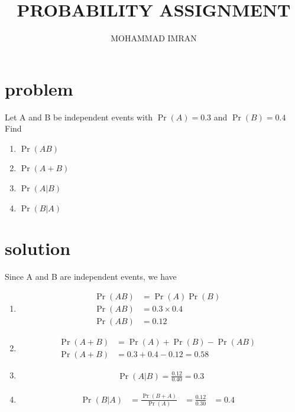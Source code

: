 \documentclass[journal,12pt,twocolumn]{article}
\title{PROBABILITY ASSIGNMENT}
\author{MOHAMMAD IMRAN}
\providecommand{\pr}[1]{\ensuremath{\Pr\left(#1\right)}}
\begin{document}
\maketitle
\bigskip

\section{problem }

Let A and B be independent events with $\pr{A}=0.3$ and $\pr{B}=0.4$ Find 
\begin{enumerate}

\item$\pr{AB}$
\item$\pr{A+B}$ 
\item$\pr{A | B}$   
\item$\pr{B | A}$
       \end{enumerate}
\section{solution }  


Since A and B are independent events, we have 

\begin{enumerate}

\item \begin{align}
 \pr{AB}&=\pr{A} \pr{B}&\\
\pr{AB}&=0.3 \times 0.4&\\
\pr{AB}&=0.12&
\end{align}
\item \begin{align}
\pr{A+B}&=\pr{A}+\pr{B}-\pr{AB}&\\
\pr{A+B}&=0.3+0.4-0.12=0.58&
\end{align}
\item \begin{align}
\pr{A|B}=\frac{0.12}{0.40}=0.3
\end{align}
\item \begin{align}
\pr{B|A}&=\frac{\pr{B+A}}{\pr{A}}&=\frac{0.12}{0.30}&=0.4&
\end{align}
\end{enumerate}
\end{document}
